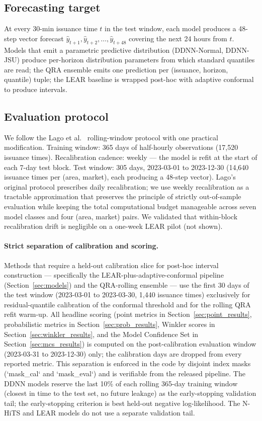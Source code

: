 \documentclass[review,3p,times,authoryear]{elsarticle}
\begin{document}
\subsection{Forecasting target}
At every 30-min issuance time \(t\) in the test window, each model produces a 48-step vector forecast \(\hat{y}_{t+1}, \hat{y}_{t+2}, \ldots, \hat{y}_{t+48}\) covering the next 24 hours from \(t\). Models that emit a parametric predictive distribution (DDNN-Normal, DDNN-JSU) produce per-horizon distribution parameters from which standard quantiles are read; the QRA ensemble emits one prediction per (issuance, horizon, quantile) tuple; the LEAR baseline is wrapped post-hoc with adaptive conformal to produce intervals.

\subsection{Evaluation protocol}\label{sec:eval_protocol}
We follow the Lago et al.\ \citep{lago2021} rolling-window protocol with one practical modification. Training window: 365 days of half-hourly observations (17{,}520 issuance times). Recalibration cadence: weekly --- the model is refit at the start of each 7-day test block. Test window: 305 days, 2023-03-01 to 2023-12-30 (14{,}640 issuance times per (area, market), each producing a 48-step vector). Lago's original protocol prescribes daily recalibration; we use weekly recalibration as a tractable approximation that preserves the principle of strictly out-of-sample evaluation while keeping the total computational budget manageable across seven model classes and four (area, market) pairs. We validated that within-block recalibration drift is negligible on a one-week LEAR pilot (not shown).

\paragraph{Strict separation of calibration and scoring.}
Methods that require a held-out calibration slice for post-hoc interval construction --- specifically the LEAR-plus-adaptive-conformal pipeline (Section~\ref{sec:models}) and the QRA-rolling ensemble --- use the first 30 days of the test window (2023-03-01 to 2023-03-30, 1{,}440 issuance times) exclusively for residual-quantile calibration of the conformal threshold and for the rolling QRA refit warm-up. All headline scoring (point metrics in Section~\ref{sec:point_results}, probabilistic metrics in Section~\ref{sec:prob_results}, Winkler scores in Section~\ref{sec:winkler_results}, and the Model Confidence Set in Section~\ref{sec:mcs_results}) is computed on the post-calibration evaluation window (2023-03-31 to 2023-12-30) only; the calibration days are dropped from every reported metric. This separation is enforced in the code by disjoint index masks (`mask\_cal` and `mask\_eval`) and is verifiable from the released pipeline. The DDNN models reserve the last 10\% of each rolling 365-day training window (closest in time to the test set, no future leakage) as the early-stopping validation tail; the early-stopping criterion is best held-out negative log-likelihood. The N-HiTS and LEAR models do not use a separate validation tail.
\end{document}
